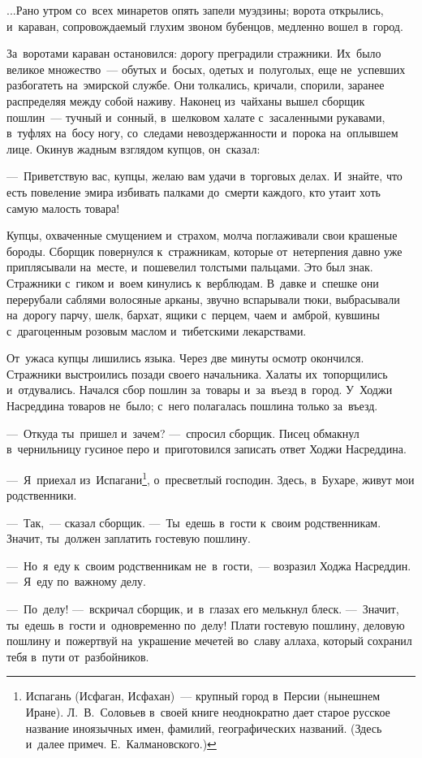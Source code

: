 \documentclass[12pt,a4paper]{book}
\begin{document}
...Рано утром со~всех минаретов опять запели муэдзины; ворота открылись, и~караван, сопровождаемый глухим звоном бубенцов, медленно вошел в~город.

За~воротами караван остановился: дорогу преградили стражники. Их~было великое множество~— обутых и~босых, одетых и~полуголых, еще не~успевших разбогатеть на~эмирской службе. Они толкались, кричали, спорили, заранее распределяя между собой наживу. Наконец из~чайханы вышел сборщик пошлин~— тучный и~сонный, в~шелковом халате с~засаленными рукавами, в~туфлях на~босу ногу, со~следами невоздержанности и~порока на~оплывшем лице. Окинув жадным взглядом купцов, он~сказал:

—~Приветствую вас, купцы, желаю вам удачи в~торговых делах. И~знайте, что есть повеление эмира избивать палками до~смерти каждого, кто утаит хоть самую малость товара!

Купцы, охваченные смущением и~страхом, молча поглаживали свои крашеные бороды. Сборщик повернулся к~стражникам, которые от~нетерпения давно уже приплясывали на~месте, и~пошевелил толстыми пальцами. Это был знак. Стражники с~гиком и~воем кинулись к~верблюдам. В~давке и~спешке они перерубали саблями волосяные арканы, звучно вспарывали тюки, выбрасывали на~дорогу парчу, шелк, бархат, ящики с~перцем, чаем и~амброй, кувшины с~драгоценным розовым маслом и~тибетскими лекарствами.

От~ужаса купцы лишились языка. Через две минуты осмотр окончился. Стражники выстроились позади своего начальника. Халаты их~топорщились и~отдувались. Начался сбор пошлин за~товары и~за~въезд в~город. У~Ходжи Насреддина товаров не~было; с~него полагалась пошлина только за~въезд.

—~Откуда ты~пришел и~зачем? —~спросил сборщик. Писец обмакнул в~чернильницу гусиное перо и~приготовился записать ответ Ходжи Насреддина.

—~Я~приехал из~Испагани\footnote{Испагань (Исфаган, Исфахан)~— крупный город в~Персии (нынешнем Иране). Л.~В.~Соловьев в~своей книге неоднократно дает старое русское название иноязычных имен, фамилий, географических названий. (Здесь и~далее примеч. Е.~Калмановского.)}, о~пресветлый господин. Здесь, в~Бухаре, живут мои родственники.

—~Так,~— сказал сборщик. —~Ты~едешь в~гости к~своим родственникам. Значит, ты~должен заплатить гостевую пошлину.

—~Но~я~еду к~своим родственникам не~в~гости,~— возразил Ходжа Насреддин. —~Я~еду по~важному делу.

—~По~делу! —~вскричал сборщик, и~в~глазах его мелькнул блеск. —~Значит, ты~едешь в~гости и~одновременно по~делу! Плати гостевую пошлину, деловую пошлину и~пожертвуй на~украшение мечетей во~славу аллаха, который сохранил тебя в~пути от~разбойников.
\end{document}
